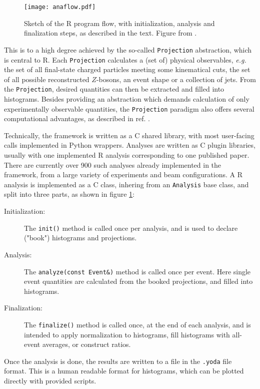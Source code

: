 \documentclass[11pt]{article}
\def\eg{\emph{e.g.}\xspace}
\newcommand{\rivet}{R\protect\scalebox{0.8}{IVET}\xspace}
\newcommand{\Cpp}{\hbox{C\raisebox{0.2ex}{\smaller \kern-.1em+\kern-.2em+}}\xspace}
\begin{document}
\begin{figure}
	\center
	\texttt{[image: anaflow.pdf]}
	\caption{\label{fig:anaflow}Sketch of the \rivet program flow, with initialization, analysis and finalization steps, as described in the text. Figure from \cite{Bierlich:2020wms}.}
\end{figure}

This is to a high degree achieved by the so-called \texttt{Projection} abstraction, which is central to \rivet. Each \texttt{Projection} calculates a (set of) physical observables, \eg the set of all final-state charged particles meeting some kinematical cuts, the set of all possible reconstructed $Z$-bosons, an event shape or a collection of jets. From the \texttt{Projection}, desired quantities can then be extracted and filled into histograms. Besides providing an abstraction which demands calculation of only experimentally observable quantities, the \texttt{Projection} paradigm also offers several computational advantages, as described in ref. \cite{Bierlich:2019rhm}.

Technically, the framework is written as a \Cpp shared library, with most user-facing calls implemented in Python wrappers. Analyses are written as \Cpp plugin libraries, usually with one implemented \rivet analysis corresponding to one published paper. There are currently over 900 such analyses already implemented in the framework, from a large variety of experiments and beam configurations. A \rivet analysis is implemented as a \Cpp class, inhering from an \texttt{Analysis} base class, and split into three parts, as shown in figure \ref{fig:anaflow}:
\begin{description}
	\item[Initialization: ] The \texttt{init()} method is called once per analysis, and is used to declare ("book") histograms and projections. 
	\item[Analysis: ] The \texttt{analyze(const Event\&)} method is called once per event. Here single event quantities are calculated from the booked projections, and filled into histograms.
	\item[Finalization: ] The \texttt{finalize()} method is called once, at the end of each analysis, and is intended to apply normalization to histograms, fill histograms with all-event averages, or construct ratios.
\end{description}
Once the analysis is done, the results are written to a file in the \texttt{.yoda} file format. This is a human readable format for histograms, which can be plotted directly with provided scripts.
\end{document}
